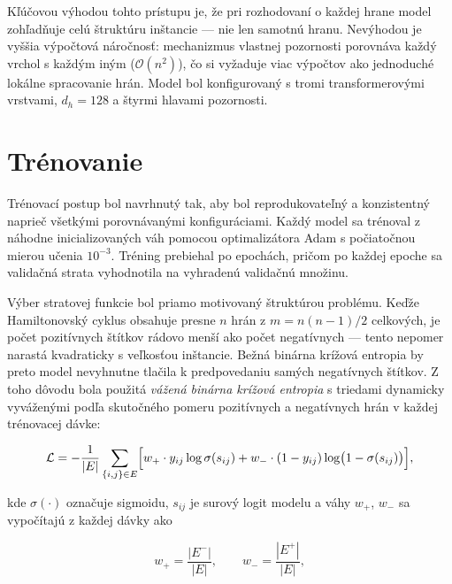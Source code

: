 \indent Kľúčovou výhodou tohto prístupu je, že pri rozhodovaní o každej
hrane model zohľadňuje celú štruktúru inštancie — nie len samotnú hranu.
Nevýhodou je vyššia výpočtová náročnosť: mechanizmus vlastnej pozornosti
porovnáva každý vrchol s každým iným (\(\mathcal{O}(n^2)\)), čo si
vyžaduje viac výpočtov ako jednoduché lokálne spracovanie hrán.
Model bol konfigurovaný s tromi transformerovými vrstvami,
\(d_h = 128\) a štyrmi hlavami pozornosti.

\section{Trénovanie}
\label{sec:trenovanie}

\indent Trénovací postup bol navrhnutý tak, aby bol reprodukovateľný
a konzistentný naprieč všetkými porovnávanými konfiguráciami. Každý model
sa trénoval z náhodne inicializovaných váh pomocou optimalizátora
Adam s počiatočnou mierou učenia \(10^{-3}\). Tréning prebiehal po
epochách, pričom po každej epoche sa validačná strata vyhodnotila na
vyhradenú validačnú množinu.

\indent Výber stratovej funkcie bol priamo motivovaný štruktúrou problému.
Keďže Hamiltonovský cyklus obsahuje presne \(n\) hrán z \(m = n(n-1)/2\)
celkových, je počet pozitívnych štítkov rádovo menší ako počet negatívnych
— tento nepomer narastá kvadraticky s veľkosťou inštancie. Bežná binárna
krížová entropia by preto model nevyhnutne tlačila k predpovedaniu samých
negatívnych štítkov. Z toho dôvodu bola použitá \emph{vážená binárna
krížová entropia} s triedami dynamicky vyváženými podľa skutočného pomeru
pozitívnych a negatívnych hrán v každej trénovacej dávke:

\begin{equation}
\mathcal{L} = -\frac{1}{|E|}
\sum_{\{i,j\} \in E}
\Bigl[
    w_+ \cdot y_{ij} \log \sigma(s_{ij})
    +
    w_- \cdot (1 - y_{ij}) \log \bigl(1 - \sigma(s_{ij})\bigr)
\Bigr],
\label{eq:bce_balanced}
\end{equation}

\noindent kde \(\sigma(\cdot)\) označuje sigmoidu, \(s_{ij}\) je surový
logit modelu a váhy \(w_+\), \(w_-\) sa vypočítajú z každej dávky ako

\begin{equation}
w_+ = \frac{|E^-|}{|E|}, \qquad w_- = \frac{|E^+|}{|E|},
\label{eq:bce_weights}
\end{equation}

